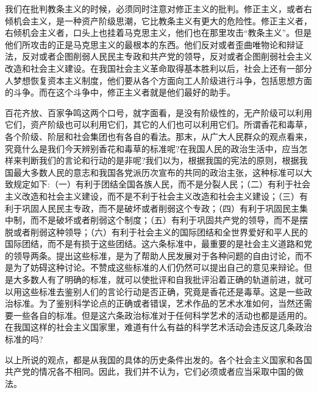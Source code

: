 \documentclass[UTF8, 12pt, a4paper]{ctexrep}
\begin{document}
我们在批判教条主义的时候，必须同时注意对修正主义的批判。修正主义，或者右倾机会主义，是一种资产阶级思潮，它比教条主义有更大的危险性。修正主义者，右倾机会主义者，口头上也挂着马克思主义，他们也在那里攻击“教条主义”。但是他们所攻击的正是马克思主义的最根本的东西。他们反对或者歪曲唯物论和辩证法，反对或者企图削弱人民民主专政和共产党的领导，反对或者企图削弱社会主义改造和社会主义建设。在我国社会主义革命取得基本胜利以后，社会上还有一部分人梦想恢复资本主义制度，他们要从各个方面向工人阶级进行斗争，包括思想方面的斗争。而在这个斗争中，修正主义者就是他们最好的助手。

百花齐放、百家争鸣这两个口号，就字面看，是没有阶级性的，无产阶级可以利用它们，资产阶级也可以利用它们，其它的人们也可以利用它们。所谓香花和毒草，各个阶级、阶层和社会集团也有各自的看法。那末，从广大人民群众的观点看来，究竟什么是我们今天辨别香花和毒草的标准呢?在我国人民的政治生活中，应当怎样来判断我们的言论和行动的是非呢?我们以为，根据我国的宪法的原则，根据我国最大多数人民的意志和我国各党派历次宣布的共同的政治主张，这种标准可以大致规定如下:（一）有利于团结全国各族人民，而不是分裂人民；（二）有利于社会主义改造和社会主义建设，而不是不利于社会主义改造和社会主义建设；（三）有利于巩固人民民主专政，而不是破坏或者削弱这个专政；（四）有利于巩固民主集中制，而不是破坏或者削弱这个制度；（五）有利于巩固共产党的领导，而不是摆脱或者削弱这种领导；（六）有利于社会主义的国际团结和全世界爱好和平人民的国际团结，而不是有损于这些团结。这六条标准中，最重要的是社会主义道路和党的领导两条。提出这些标准，是为了帮助人民发展对于各种问题的自由讨论，而不是为了妨碍这种讨论。不赞成这些标准的人们仍然可以提出自己的意见来辩论。但是大多数人有了明确的标准，就可以使批评和自我批评沿着正确的轨道前进，就可以用这些标准去鉴别人们的言论行动是否正确，究竟是香花还是毒草。这是一些政治标准。为了鉴别科学论点的正确或者错误，艺术作品的艺术水准如何，当然还需要一些各自的标准。但是这六条政治标准对于任何科学艺术的活动也都是适用的。在我国这样的社会主义国家里，难道有什么有益的科学艺术活动会违反这几条政治标准的吗?

以上所说的观点，都是从我国的具体的历史条件出发的。各个社会主义国家和各国共产党的情况各不相同。因此，我们并不认为，它们必须或者应当采取中国的做法。
\end{document}
